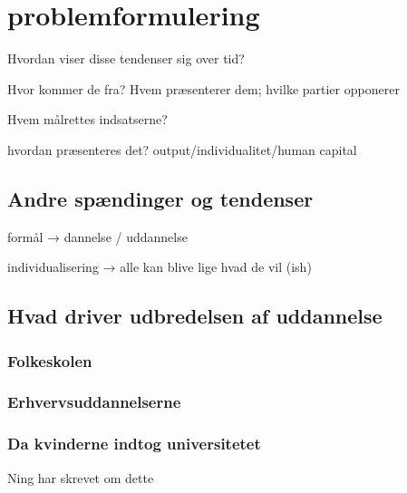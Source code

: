 \section{problemformulering}

Hvordan viser disse tendenser sig over tid?

Hvor kommer de fra? Hvem præsenterer dem; hvilke partier opponerer

Hvem målrettes indsatserne?

hvordan præsenteres det? output/individualitet/human capital
\subsection{Andre spændinger og tendenser}
formål → dannelse / uddannelse

individualisering → alle kan blive lige hvad de vil (ish)

\subsection{Hvad driver udbredelsen af uddannelse}

\subsubsection{Folkeskolen}

\subsubsection{Erhvervsuddannelserne}

\subsubsection{Da kvinderne indtog universitetet}
Ning har skrevet om dette


